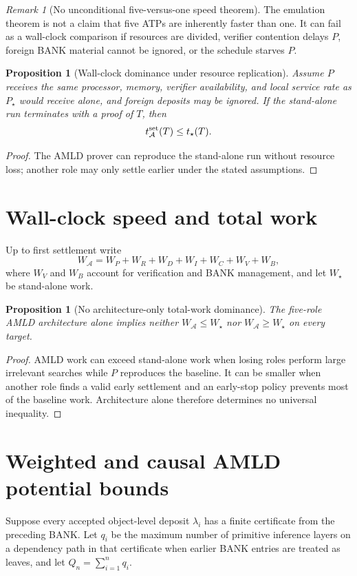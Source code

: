 \documentclass[11pt]{article}
\newtheorem{proposition}[definition]{Proposition}
\theoremstyle{remark}
\newtheorem{remark}[definition]{Remark}
\begin{document}
\begin{remark}[No unconditional five-versus-one speed theorem]
The emulation theorem is not a claim that five ATPs are inherently faster than one. It can fail as a wall-clock comparison if resources are divided, verifier contention delays $P$, foreign BANK material cannot be ignored, or the schedule starves $P$.
\end{remark}

\begin{proposition}[Wall-clock dominance under resource replication]
Assume $P$ receives the same processor, memory, verifier availability, and local service rate as $P_\star$ would receive alone, and foreign deposits may be ignored. If the stand-alone run terminates with a proof of $T$, then
\[
t^{\rm set}_{\mathcal A}(T)\le t_\star(T).
\]
\end{proposition}
\begin{proof}
The AMLD prover can reproduce the stand-alone run without resource loss; another role may only settle earlier under the stated assumptions.
\end{proof}

\section{Wall-clock speed and total work}
Up to first settlement write
\[
W_{\mathcal A}=W_P+W_R+W_D+W_I+W_C+W_V+W_B,
\]
where $W_V$ and $W_B$ account for verification and BANK management, and let $W_\star$ be stand-alone work.

\begin{proposition}[No architecture-only total-work dominance]
The five-role AMLD architecture alone implies neither $W_{\mathcal A}\le W_\star$ nor $W_{\mathcal A}\ge W_\star$ on every target.
\end{proposition}
\begin{proof}
AMLD work can exceed stand-alone work when losing roles perform large irrelevant searches while $P$ reproduces the baseline. It can be smaller when another role finds a valid early settlement and an early-stop policy prevents most of the baseline work. Architecture alone therefore determines no universal inequality.
\end{proof}

\section{Weighted and causal AMLD potential bounds}
Suppose every accepted object-level deposit $\lambda_i$ has a finite certificate from the preceding BANK. Let $q_i$ be the maximum number of primitive inference layers on a dependency path in that certificate when earlier BANK entries are treated as leaves, and let $Q_n=\sum_{i=1}^{n}q_i$.
\end{document}
